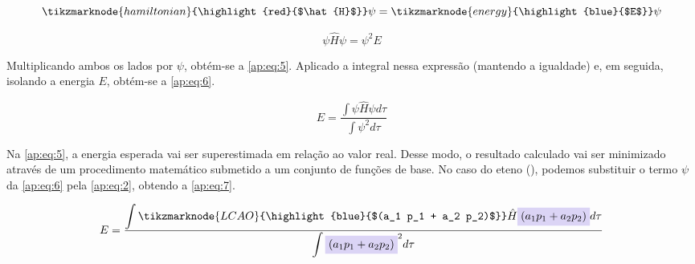 
\begin{figure}[htb]
    \vspace{2\baselineskip}
\begin{equation}
\label{ap:eq:4}
    \tikzmarknode{hamiltonian}{\highlight{red}{$\hat{H}$}} \psi = \tikzmarknode{energy}{\highlight{blue}{$E$}} \psi
\end{equation}
\end{figure}

\begin{equation}
\label{ap:eq:5}
    \psi \hat{H} \psi = \psi^2 E
\end{equation}

Multiplicando ambos os lados por $\psi$, obtém-se a \autoref{ap:eq:5}. Aplicado a integral nessa expressão (mantendo a igualdade) e, em seguida, isolando a energia $E$, obtém-se a \autoref{ap:eq:6}.

\begin{equation}
\label{ap:eq:6}
    E = \frac{\displaystyle \int \psi \hat{H} \psi d\tau}{\displaystyle \int \psi^2 d\tau}
\end{equation}

Na \autoref{ap:eq:5}, a energia esperada vai ser superestimada em relação ao valor real. Desse modo, o resultado calculado vai ser minimizado através de um procedimento matemático submetido a um conjunto de funções de base. No caso do eteno (), podemos substituir o termo $\psi$ da \autoref{ap:eq:6} pela \autoref{ap:eq:2}, obtendo a \autoref{ap:eq:7}.

\begin{figure}[htb]
    \vspace{2\baselineskip}
\begin{equation}
\label{ap:eq:7}
    E = \frac{\displaystyle \int \tikzmarknode{LCAO}{\highlight{blue}{$(a_1 p_1 + a_2 p_2)$}} \hat{H} \highlight{blue}{$(a_1 p_1 + a_2 p_2)$} d\tau}{\displaystyle \int \highlight{blue}{$(a_1 p_1 + a_2 p_2)$}^2 d\tau}
\end{equation}
\end{figure}

